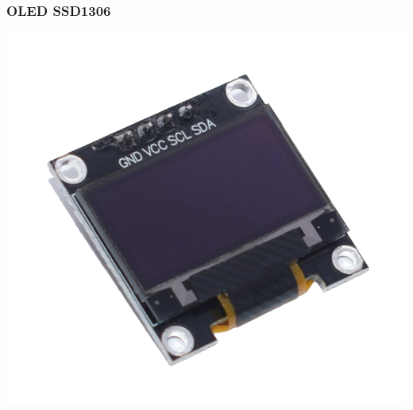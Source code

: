\documentclass[12pt,a4paper,portrait]{article}
\begin{document}
			\subsubsection{OLED SSD1306}
				\begin{center}
					\includegraphics[scale=0.6]{./img/display_oled.png}
				\end{center}
\end{document}
